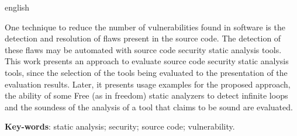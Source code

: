 \begin{resumo}[Abstract]
 \begin{otherlanguage*}{english}

   One technique to reduce the number of vulnerabilities found in software is
   the detection and resolution of flaws present in the source code.
   The detection of these flaws may be automated with source code security
   static analysis tools. This work presents an approach to evaluate source
   code security static analysis tools, since the selection of the tools being
   evaluated to the presentation of the evaluation results. Later, it presents
   usage examples for the proposed approach, the ability of some Free (as in
   freedom) static analyzers to detect infinite loops and the soundess of the
   analysis of a tool that claims to be sound are evaluated. 

   \vspace{\onelineskip}
 
   \noindent 
   \textbf{Key-words}: static analysis; security; source code; vulnerability.
 \end{otherlanguage*}
\end{resumo}
